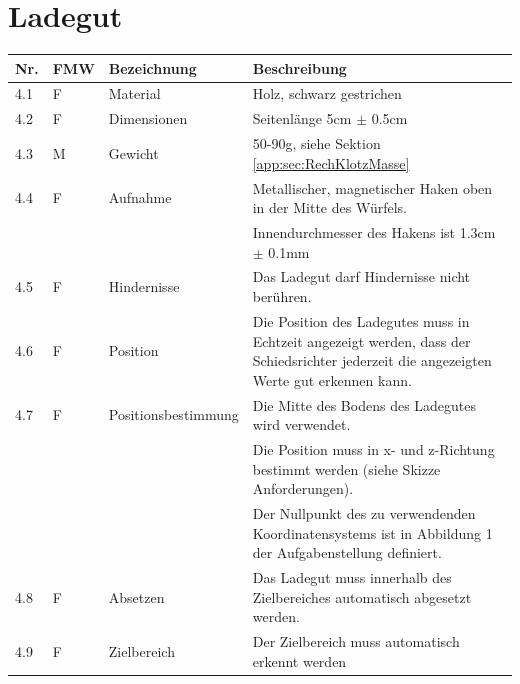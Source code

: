 \documentclass[a4paper]{report}
\begin{document}
\section{Ladegut}
\label{app:sec:AnfLadegut}
\begin{tabular}{|p{}|p{}|p{}|p{}|}
	\hline
	\textbf{Nr.} & \textbf{FMW\footnotemark} & \textbf{Bezeichnung} & \textbf{Beschreibung} \\
	\hline
	4.1 & F & Material & Holz, schwarz gestrichen \\
	\hline
	4.2 & F &  Dimensionen & Seitenlänge 5cm $\pm$ 0.5cm \\
	\hline
	4.3 & M & Gewicht & 50-90g, siehe Sektion \ref{app:sec:RechKlotzMasse} \\
	\hline
	4.4 & F & Aufnahme & Metallischer, magnetischer Haken oben in der Mitte des Würfels.\\
	& & & Innendurchmesser des Hakens ist 1.3cm $\pm$ 0.1mm\\
	\hline
	4.5 & F & Hindernisse & Das Ladegut darf Hindernisse nicht berühren. \\
	\hline
	4.6 & F & Position & Die Position des Ladegutes muss in Echtzeit angezeigt werden, dass der Schiedsrichter jederzeit die angezeigten Werte gut erkennen kann.\\
	\hline
	4.7 & F & Positionsbestimmung & Die Mitte des Bodens des Ladegutes wird verwendet.\\
	& & & Die Position muss in x- und z-Richtung bestimmt werden (siehe Skizze Anforderungen).\\
	& & & Der Nullpunkt des zu verwendenden Koordinatensystems ist in Abbildung 1 der Aufgabenstellung definiert. \\
	\hline
	4.8 & F & Absetzen & Das Ladegut muss innerhalb des Zielbereiches automatisch abgesetzt werden. \\
	\hline
	4.9 & F & Zielbereich & Der Zielbereich muss automatisch erkennt werden\\
	\hline
\end{tabular}
\end{document}
